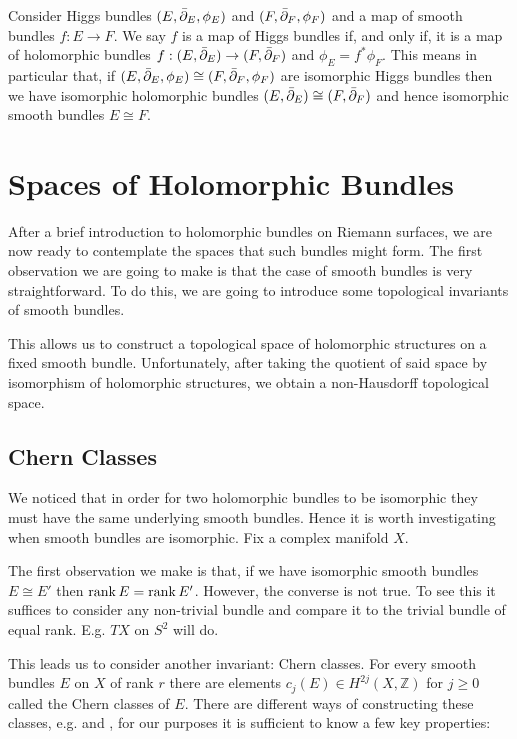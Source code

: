 \documentclass[12pt]{ociamthesis}  %
\begin{document}
Consider Higgs bundles $(E,{\bar{\partial}}_E,\phi_E)$ and $(F,{\bar{\partial}}_F,\phi_F)$
and a map of smooth bundles $f:E\to F$. We say $f$ is a map of Higgs
bundles if, and only if, it is a map of holomorphic bundles
$f:(E,{\bar{\partial}}_E)\to (F,{\bar{\partial}}_F)$ and $\phi_E = f^*\phi_F$.
This means in particular that, if
$(E,{\bar{\partial}}_E,\phi_E)\cong(F,{\bar{\partial}}_F,\phi_F)$
are isomorphic Higgs bundles then we have isomorphic holomorphic bundles
$(E,{\bar{\partial}}_E)\cong(F,{\bar{\partial}}_F)$ and hence isomorphic smooth bundles
$E\cong F$.

\section{Spaces of Holomorphic Bundles}

After a brief introduction to holomorphic bundles on Riemann surfaces,
we are now ready to contemplate the spaces that such bundles might
form. The first observation we are going to make is that the case of
smooth bundles is very straightforward. To do this, we are going to
introduce some topological invariants of smooth bundles.

This allows us to construct a topological space of holomorphic structures
on a fixed smooth bundle. Unfortunately, after taking the quotient
of said space by isomorphism of holomorphic structures, we obtain a
non-Hausdorff topological space.

\subsection{Chern Classes}

We noticed that in order for two holomorphic bundles to be isomorphic
they must have the same underlying smooth bundles. Hence it is worth
investigating when smooth bundles are isomorphic. Fix a complex
manifold $X$.

The first observation we make is that, if we have isomorphic smooth
bundles $E\cong E'$ then $\operatorname{rank} E = \operatorname{rank} E'$. However, the converse
is not true. To see this it suffices to consider any non-trivial
bundle and compare it to the trivial bundle of equal rank. E.g.
$TX$ on $S^2$ will do.

This leads us to consider another invariant: Chern classes. For
every smooth bundles $E$ on $X$ of rank $r$ there are elements
$c_j(E)\in H^{2j}(X,\mathbb{Z})$ for $j\geq 0$ called the Chern
classes of $E$. There are different ways of constructing these classes,
e.g. \cite{fine2013} and \cite{griffiths1994}, for our purposes
it is sufficient to know a few key properties:
\end{document}

